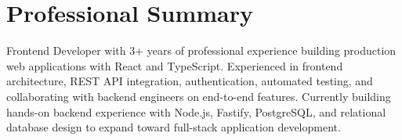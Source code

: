 \section{Professional Summary}

Frontend Developer with 3+ years of professional experience building production web applications with React and TypeScript. Experienced in frontend architecture, REST API integration, authentication, automated testing, and collaborating with backend engineers on end-to-end features. Currently building hands-on backend experience with Node.js, Fastify, PostgreSQL, and relational database design to expand toward full-stack application development.
